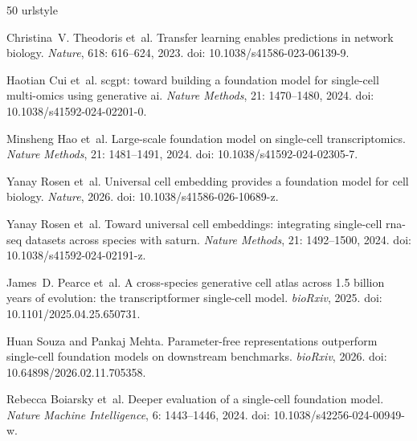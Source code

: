\documentclass[12pt]{article}
\begin{document}
\begin{thebibliography}{50}
\providecommand{\natexlab}[1]{#1}
\providecommand{\url}[1]{\texttt{#1}}
\expandafter\ifx\csname urlstyle\endcsname\relax
  \providecommand{\doi}[1]{doi: #1}\else
  \providecommand{\doi}{doi: \begingroup \urlstyle{rm}\Url}\fi

Christina~V. Theodoris et~al.
\newblock Transfer learning enables predictions in network biology.
\newblock \emph{Nature}, 618: 616--624, 2023.
\newblock \doi{10.1038/s41586-023-06139-9}.

Haotian Cui et~al.
\newblock scgpt: toward building a foundation model for single-cell multi-omics
  using generative ai.
\newblock \emph{Nature Methods}, 21: 1470--1480, 2024.
\newblock \doi{10.1038/s41592-024-02201-0}.

Minsheng Hao et~al.
\newblock Large-scale foundation model on single-cell transcriptomics.
\newblock \emph{Nature Methods}, 21: 1481--1491, 2024.
\newblock \doi{10.1038/s41592-024-02305-7}.

Yanay Rosen et~al.
\newblock Universal cell embedding provides a foundation model for cell
  biology.
\newblock \emph{Nature}, 2026.
\newblock \doi{10.1038/s41586-026-10689-z}.

Yanay Rosen et~al.
\newblock Toward universal cell embeddings: integrating single-cell rna-seq
  datasets across species with saturn.
\newblock \emph{Nature Methods}, 21: 1492--1500, 2024.
\newblock \doi{10.1038/s41592-024-02191-z}.

James~D. Pearce et~al.
\newblock A cross-species generative cell atlas across 1.5 billion years of
  evolution: the transcriptformer single-cell model.
\newblock \emph{bioRxiv}, 2025.
\newblock \doi{10.1101/2025.04.25.650731}.

Huan Souza and Pankaj Mehta.
\newblock Parameter-free representations outperform single-cell foundation
  models on downstream benchmarks.
\newblock \emph{bioRxiv}, 2026.
\newblock \doi{10.64898/2026.02.11.705358}.

Rebecca Boiarsky et~al.
\newblock Deeper evaluation of a single-cell foundation model.
\newblock \emph{Nature Machine Intelligence}, 6: 1443--1446, 2024.
\newblock \doi{10.1038/s42256-024-00949-w}.


\end{thebibliography}
\end{document}

